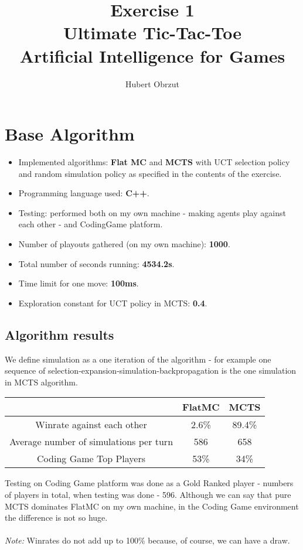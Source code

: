 \documentclass[11pt]{article}
\title{
	Exercise 1 \\
	Ultimate Tic-Tac-Toe \\
	Artificial Intelligence for Games \\
}
\author{Hubert Obrzut}
\begin{document}
	\maketitle
	
	\section{Base Algorithm}
	 \begin{itemize}
	 	\item Implemented algorithms: \textbf{Flat MC} and \textbf{MCTS} with UCT selection policy and random simulation policy as specified in the contents of the exercise.
	 	\item Programming language used: \textbf{C++}.
	 	\item Testing: performed both on my own machine - making agents play against each other - and CodingGame platform.
	 	\item Number of playouts gathered (on my own machine): \textbf{1000}.
	 	\item Total number of seconds running: \textbf{4534.2s}.
	 	\item Time limit for one move: \textbf{100ms}.
	 	\item Exploration constant for UCT policy in MCTS: \textbf{0.4}.
	 \end{itemize}
	 \subsection{Algorithm results}
	 We define simulation as a one iteration of the algorithm - for example one sequence of selection-expansion-simulation-backpropagation is the one simulation in MCTS algorithm. 
	 \begin{center}
		 \begin{tabular}{| c | c | c |}
		 \hline
		  & FlatMC & MCTS \\ \hline
		  Winrate against each other & 2.6\% & 89.4\% \\ \hline
		  Average number of simulations per turn & 586 & 658 \\ \hline
		  Coding Game Top Players & 53\% & 34\% \\ \hline
		 \end{tabular}
	 \end{center}
	 Testing on Coding Game platform was done as a Gold Ranked player - numbers of players in total, when testing was done - 596. Although we can say that pure MCTS dominates FlatMC on my own machine, in the Coding Game environment the difference is not so huge. \\\\
	\textit{Note:} Winrates do not add up to 100\% because, of course, we can have a draw.
	
\end{document}
